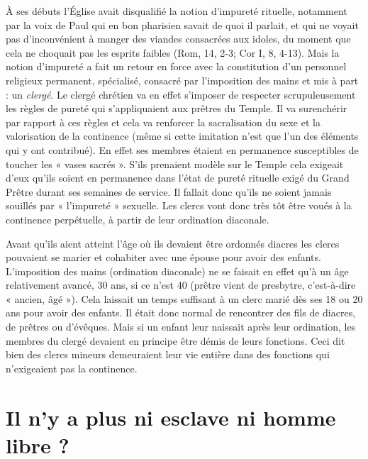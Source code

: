 À ses débuts l'Église avait disqualifié la notion d'impureté rituelle, notamment par la voix de Paul qui en bon pharisien savait de quoi il parlait, et qui ne voyait pas d'inconvénient à manger des viandes consacrées aux idoles, du moment que cela ne choquait pas les esprits faibles (Rom, 14, 2-3; Cor I, 8, 4-13). Mais la notion d'impureté a fait un retour en force avec la constitution d'un personnel religieux permanent, spécialisé, consacré par l'imposition des mains et mis à part : un \emph{clergé}. Le clergé chrétien va en effet s'imposer de respecter scrupuleusement les règles de pureté qui s'appliquaient aux prêtres du Temple. Il va surenchérir par rapport à ces règles et cela va renforcer la sacralisation du sexe et la valorisation de la continence (même si cette imitation n'est que l'un des éléments qui y ont contribué). En effet ses membres étaient en permanence susceptibles de toucher les « vases sacrés ». S'ils prenaient modèle sur le Temple cela exigeait d'eux qu'ils soient en permanence dans l'état de pureté rituelle exigé du Grand Prêtre durant ses semaines de service. Il fallait donc qu'ils ne soient jamais souillés par « l'impureté » sexuelle. Les clercs vont donc très tôt être voués à la continence perpétuelle, à partir de leur ordination diaconale. 

 Avant qu'ils aient atteint l'âge où ils devaient être ordonnés diacres les clercs pouvaient se marier et cohabiter avec une épouse pour avoir des enfants. L'imposition des mains (ordination diaconale) ne se faisait en effet qu'à un âge relativement avancé, 30 ans, si ce n'est 40 (prêtre vient de presbytre, c'est-à-dire « ancien, âgé »). Cela laissait un temps suffisant à un clerc marié dès ses 18 ou 20 ans pour avoir des enfants. Il était donc normal de rencontrer des fils de diacres, de prêtres ou d'évêques. Mais si un enfant leur naissait après leur ordination, les membres du clergé devaient en principe être démis de leurs fonctions. Ceci dit bien des clercs mineurs demeuraient leur vie entière dans des fonctions qui n'exigeaient pas la continence. 


\section{Il n'y a plus ni esclave ni homme libre ?}


 
 
